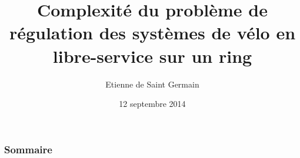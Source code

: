 \documentclass{beamer}
\theoremstyle{plain} %
\theoremstyle{definition} %
\begin{document}
\title{Complexité du problème de régulation des systèmes de vélo en libre-service sur un ring}
\author{Etienne de Saint Germain}
\date{12 septembre 2014}

\begin{frame}
  \titlepage
\end{frame}

\begin{frame}
\frametitle{Sommaire}
\tableofcontents[hideothersubsections]
\end{frame}








\end{document}
